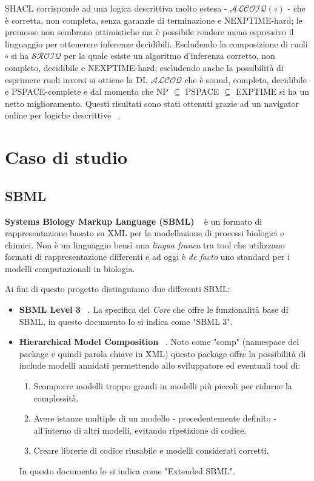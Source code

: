 \documentclass{article}
\begin{document}
SHACL corrisponde ad una logica descrittiva molto estesa - $\mathcal{ALCOIQ(\circ)}$ - che è corretta, non completa, senza garanzie di terminazione e NEXPTIME-hard; le premesse non sembrano ottimistiche ma è possibile rendere meno espressivo il linguaggio per ottenerere inferenze decidibili. Escludendo la composizione di ruoli $\circ$ si ha $\mathcal{SROIQ}$ per la quale esiste un algoritmo d'inferenza corretto, non completo, decidibile e NEXPTIME-hard; escludendo anche la possibilità di esprimere ruoli inversi si ottiene la DL $\mathcal{ALCOQ}$ che è sound, completa, decidibile e PSPACE-complete e dal momento che NP $\subseteq$ PSPACE $\subseteq$ EXPTIME si ha un netto miglioramento. Questi risultati sono stati ottenuti grazie ad un navigator online per logiche descrittive ~\cite{dl:complexity}.

\clearpage
\section{Caso di studio}

\subsection{SBML}
\textbf{Systems Biology Markup Language (SBML)} ~\cite{sbml} è un formato di rappresentazione basato su XML per la modellazione di processi biologici e chimici. Non è un linguaggio bensì una \textit{lingua franca} tra tool che utilizzano formati di rappresentazione differenti e ad oggi è \textit{de facto} uno standard per i modelli computazionali in biologia. 

Ai fini di questo progetto distinguiamo due differenti SBML:
\begin{itemize}
    \item \textbf{SBML Level 3} ~\cite{sbml:core}. La specifica del \textit{Core} che offre le funzionalità base di SBML, in questo documento lo si indica come "SBML 3".
    \item \textbf{Hierarchical Model Composition} ~\cite{sbml:hierarcical}. Noto come "comp" (namespace del package e quindi parola chiave in XML) questo package offre la possibilità di include modelli annidati permettendo allo sviluppatore ed eventuali tool di:
    \begin{enumerate}
        \item Scomporre modelli troppo grandi in modelli più piccoli per ridurne la complessità.
        \item Avere istanze multiple di un modello - precedentemente definito - all'interno di altri modelli, evitando ripetizione di codice. 
        \item Creare librerie di codice riusabile e modelli considerati corretti. 
    \end{enumerate}
    In questo documento lo si indica come "Extended SBML". 
\end{itemize}
\end{document}
